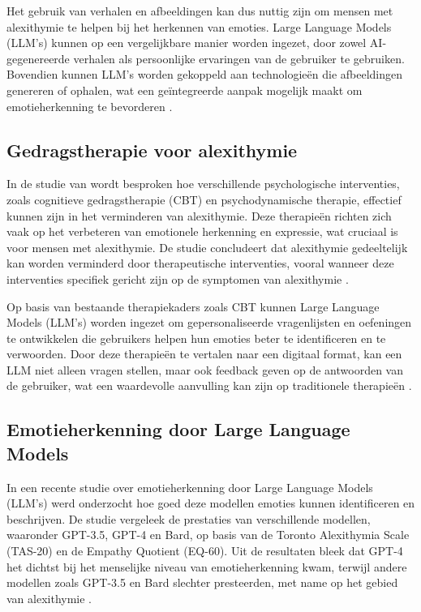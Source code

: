 Het gebruik van verhalen en afbeeldingen kan dus nuttig zijn om mensen met alexithymie te helpen bij het herkennen van emoties. Large Language Models (LLM's) kunnen op een vergelijkbare manier worden ingezet, door zowel AI-gegenereerde verhalen als persoonlijke ervaringen van de gebruiker te gebruiken. Bovendien kunnen LLM's worden gekoppeld aan technologieën die afbeeldingen genereren of ophalen, wat een geïntegreerde aanpak mogelijk maakt om emotieherkenning te bevorderen \autocite{Lukas2019}.

\subsection{Gedragstherapie voor alexithymie}
\label{subsec:gedragstherapie-voor-alexithymie}%

In de studie van \textcite{Cameron2014} wordt besproken hoe verschillende psychologische interventies, zoals cognitieve gedragstherapie (CBT) en psychodynamische therapie, effectief kunnen zijn in het verminderen van alexithymie. Deze therapieën richten zich vaak op het verbeteren van emotionele herkenning en expressie, wat cruciaal is voor mensen met alexithymie. De studie concludeert dat alexithymie gedeeltelijk kan worden verminderd door therapeutische interventies, vooral wanneer deze interventies specifiek gericht zijn op de symptomen van alexithymie \autocite{Cameron2014}.

Op basis van bestaande therapiekaders zoals CBT kunnen Large Language Models (LLM's) worden ingezet om gepersonaliseerde vragenlijsten en oefeningen te ontwikkelen die gebruikers helpen hun emoties beter te identificeren en te verwoorden. Door deze therapieën te vertalen naar een digitaal format, kan een LLM niet alleen vragen stellen, maar ook feedback geven op de antwoorden van de gebruiker, wat een waardevolle aanvulling kan zijn op traditionele therapieën \autocite{Cameron2014}.

\subsection{Emotieherkenning door Large Language Models}
\label{subsec:emotieherkenning-door-large-language-models}%

In een recente studie over emotieherkenning door Large Language Models (LLM's) werd onderzocht hoe goed deze modellen emoties kunnen identificeren en beschrijven. De studie vergeleek de prestaties van verschillende modellen, waaronder GPT-3.5, GPT-4 en Bard, op basis van de Toronto Alexithymia Scale (TAS-20) en de Empathy Quotient (EQ-60). Uit de resultaten bleek dat GPT-4 het dichtst bij het menselijke niveau van emotieherkenning kwam, terwijl andere modellen zoals GPT-3.5 en Bard slechter presteerden, met name op het gebied van alexithymie \autocite{Patel2023}.

